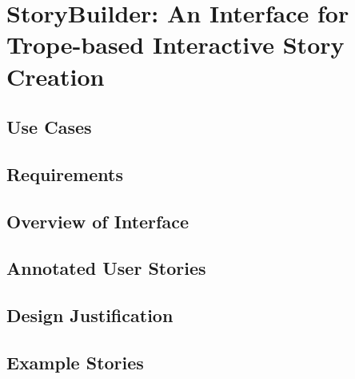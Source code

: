 
\chapter{StoryBuilder: An Interface for Trope-based Interactive Story Creation}
\label{cha:storybuilder}


\section{Use Cases}

\section{Requirements}

\section{Overview of Interface}


\section{Annotated User Stories}


\section{Design Justification}


\section{Example Stories}


